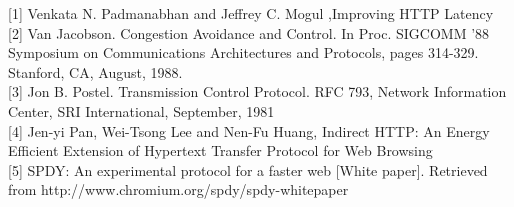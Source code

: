 \documentclass[9pt]{sigplan-proc-varsize}
\begin{document}
[1] Venkata N. Padmanabhan and Jeffrey C. Mogul ,Improving HTTP Latency \\[\baselineskip]
[2] Van Jacobson. Congestion Avoidance and Control. In Proc. SIGCOMM ’88 Symposium on Communications Architectures and Protocols, pages 314-329. Stanford, CA, August, 1988. \\[\baselineskip]
[3] Jon B. Postel. Transmission Control Protocol. RFC 793, Network Information Center, SRI International, September, 1981 \\[\baselineskip]
[4] Jen-yi Pan, Wei-Tsong Lee and Nen-Fu Huang, Indirect HTTP: An Energy Efficient Extension of Hypertext Transfer Protocol for Web Browsing \\[\baselineskip]
[5] SPDY: An experimental protocol for a faster web [White paper]. Retrieved from http://www.chromium.org/spdy/spdy-whitepaper
\end{document}
